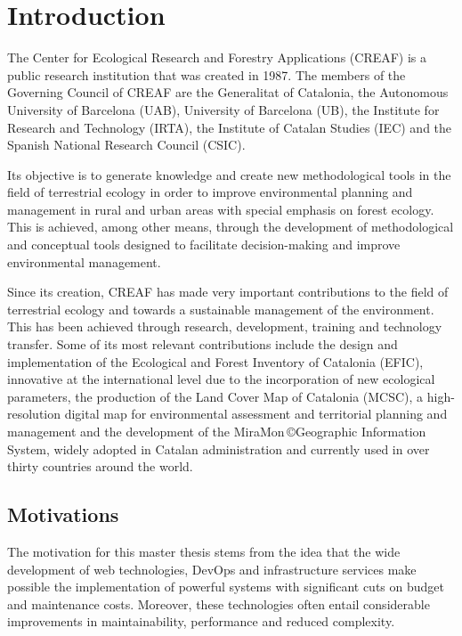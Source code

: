 
\chapter{Introduction}

The Center for Ecological Research and Forestry Applications (CREAF) is a public research institution that was created in 1987.  The members of the Governing Council of CREAF are the Generalitat of Catalonia, the Autonomous University of Barcelona (UAB), University of Barcelona (UB), the Institute for Research and Technology (IRTA), the Institute of Catalan Studies (IEC) and the Spanish National Research Council (CSIC).

Its objective is to generate knowledge and create new methodological tools in the field of terrestrial ecology in order to improve environmental planning and management in rural and urban areas with special emphasis on forest ecology. This is achieved, among other means, through the development of methodological and conceptual tools designed to facilitate decision-making and improve environmental management.

Since its creation, CREAF has made very important contributions to the field of terrestrial ecology and towards a sustainable management of the environment. This has been achieved through research, development, training and technology transfer. Some of its most relevant contributions include the design and implementation of the Ecological and Forest Inventory of Catalonia (EFIC), innovative at the international level due to the incorporation of new ecological parameters, the production of the Land Cover Map of Catalonia (MCSC), a high-resolution digital map for environmental assessment and territorial planning and management and the development of the MiraMon \copyright  Geographic Information System, widely adopted in Catalan administration and currently used in over thirty countries around the world.


\section{Motivations}

The motivation for this master thesis stems from the idea that the wide development of web technologies, DevOps and infrastructure services make possible the implementation of powerful systems with significant cuts on budget and maintenance costs. Moreover, these technologies often entail considerable improvements in maintainability, performance and reduced complexity.

